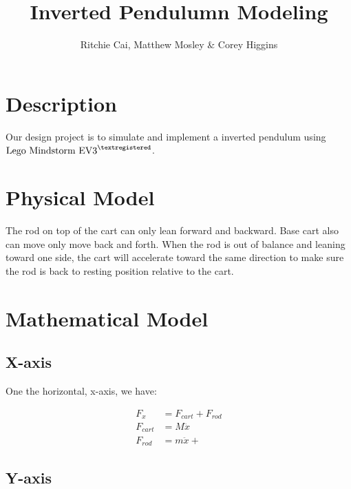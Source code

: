 \documentclass{notes}
\author{Ritchie Cai, Matthew Mosley \& Corey Higgins}
\title{Inverted Pendulumn Modeling}
\begin{document}
\maketitle 

\section{Description}
Our design project is to simulate and implement a inverted pendulum using 
$\text{Lego Mindstorm EV3}^{\textregistered}$. 

\section{Physical Model}


The rod on top of the cart can only lean forward and backward. 
Base cart also can move only move back and forth. 
When the rod is out of balance and leaning toward one side, the cart will accelerate toward the same
direction to make sure the rod is back to resting position relative to the cart.

\section{Mathematical Model}

\subsection{X-axis}
One the horizontal, x-axis, we have:

\begin{align*}
  F_x & = F_{cart} + F_{rod} \\
  F_{cart} & = M\ddot{x}  \\
  F_{rod} &  = m\ddot{x} + 
\end{align*}

\subsection{Y-axis}
\end{document}
